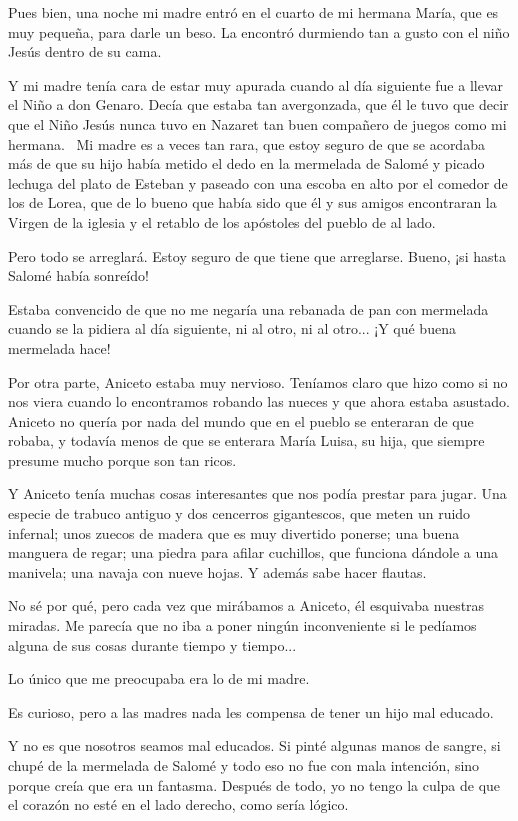 \documentclass{barcodevapor3pags}
\begin{document}
Pues bien, una noche mi madre entró en el cuarto de mi hermana María,
que es muy pequeña, para darle un beso. La encontró durmiendo tan a
gusto con el niño Jesús dentro de su cama.~

Y mi madre tenía cara de estar muy apurada cuando al día siguiente fue a
llevar el Niño a don Genaro. Decía que estaba tan avergonzada, que él le
tuvo que decir que el Niño Jesús nunca tuvo en Nazaret tan buen
compañero de juegos como mi hermana.~
Mi madre es a veces tan rara, que estoy seguro de que se acordaba más de
que su hijo había metido el dedo en la mermelada de Salomé y picado
lechuga del plato de Esteban y paseado con una escoba en alto por el
comedor de los de Lorea, que de lo bueno que había sido que él y sus
amigos encontraran la Virgen de la iglesia y el retablo de los apóstoles
del pueblo de al lado.~

Pero todo se arreglará. Estoy seguro de que tiene que arreglarse. Bueno,
¡si hasta Salomé había sonreído!~

Estaba convencido de que no me negaría una rebanada de pan con mermelada
cuando se la pidiera al día siguiente, ni al otro, ni al otro... ¡Y qué
buena mermelada hace!~

Por otra parte, Aniceto estaba muy nervioso. Teníamos claro que hizo
como si no nos viera cuando lo encontramos robando las nueces y que
ahora estaba asustado. Aniceto no quería por nada del mundo que en el
pueblo se enteraran de que robaba, y todavía menos de que se enterara
María Luisa, su hija, que siempre presume mucho porque son tan ricos.~

Y Aniceto tenía muchas cosas interesantes que nos podía prestar para
jugar. Una especie de trabuco antiguo y dos cencerros gigantescos, que
meten un ruido infernal; unos zuecos de madera que es muy divertido
ponerse; una buena manguera de regar; una piedra para afilar cuchillos,
que funciona dándole a una manivela; una navaja con nueve hojas. Y
además sabe hacer flautas.~

No sé por qué, pero cada vez que mirábamos a Aniceto, él esquivaba
nuestras miradas. Me parecía que no iba a poner ningún inconveniente si
le pedíamos alguna de sus cosas durante tiempo y tiempo...~

Lo único que me preocupaba era lo de mi madre.~

Es curioso, pero a las madres nada les compensa de tener un hijo mal
educado.~

Y no es que nosotros seamos mal educados. Si pinté algunas manos de
sangre, si chupé de la mermelada de Salomé y todo eso no fue con mala
intención, sino porque creía que era un fantasma. Después de todo, yo no
tengo la culpa de que el corazón no esté en el lado derecho, como sería
lógico.~
\end{document}
